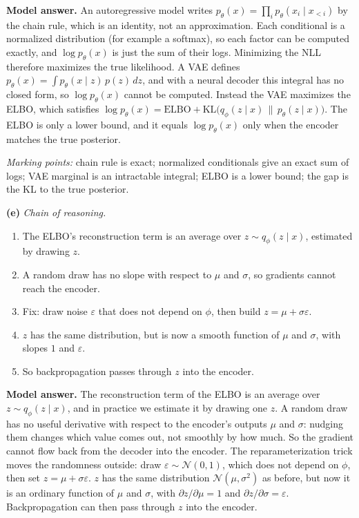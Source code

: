 \documentclass[12pt,a4paper]{article}
\begin{document}
\textbf{Model answer.} An autoregressive model writes $p_\theta(x)=\prod_i p_\theta(x_i\mid x_{<i})$ by the chain rule, which is an identity, not an approximation. Each conditional is a normalized distribution (for example a softmax), so each factor can be computed exactly, and $\log p_\theta(x)$ is just the sum of their logs. Minimizing the NLL therefore maximizes the true likelihood. A VAE defines $p_\theta(x)=\int p_\theta(x\mid z)\,p(z)\,dz$, and with a neural decoder this integral has no closed form, so $\log p_\theta(x)$ cannot be computed. Instead the VAE maximizes the ELBO, which satisfies $\log p_\theta(x)=\text{ELBO}+\mathrm{KL}\big(q_\phi(z\mid x)\,\|\,p_\theta(z\mid x)\big)$. The ELBO is only a lower bound, and it equals $\log p_\theta(x)$ only when the encoder matches the true posterior.

\emph{Marking points:} chain rule is exact; normalized conditionals give an exact sum of logs; VAE marginal is an intractable integral; ELBO is a lower bound; the gap is the KL to the true posterior.

\textbf{(e)} \emph{Chain of reasoning.}
\begin{enumerate}[nosep]
  \item The ELBO's reconstruction term is an average over $z\sim q_\phi(z\mid x)$, estimated by drawing $z$.
  \item A random draw has no slope with respect to $\mu$ and $\sigma$, so gradients cannot reach the encoder.
  \item Fix: draw noise $\varepsilon$ that does not depend on $\phi$, then build $z=\mu+\sigma\varepsilon$.
  \item $z$ has the same distribution, but is now a smooth function of $\mu$ and $\sigma$, with slopes $1$ and $\varepsilon$.
  \item So backpropagation passes through $z$ into the encoder.
\end{enumerate}

\textbf{Model answer.} The reconstruction term of the ELBO is an average over $z\sim q_\phi(z\mid x)$, and in practice we estimate it by drawing one $z$. A random draw has no useful derivative with respect to the encoder's outputs $\mu$ and $\sigma$: nudging them changes which value comes out, not smoothly by how much. So the gradient cannot flow back from the decoder into the encoder. The reparameterization trick moves the randomness outside: draw $\varepsilon\sim\mathcal{N}(0,1)$, which does not depend on $\phi$, then set $z=\mu+\sigma\varepsilon$. $z$ has the same distribution $\mathcal{N}(\mu,\sigma^2)$ as before, but now it is an ordinary function of $\mu$ and $\sigma$, with $\partial z/\partial\mu=1$ and $\partial z/\partial\sigma=\varepsilon$. Backpropagation can then pass through $z$ into the encoder.
\end{document}
